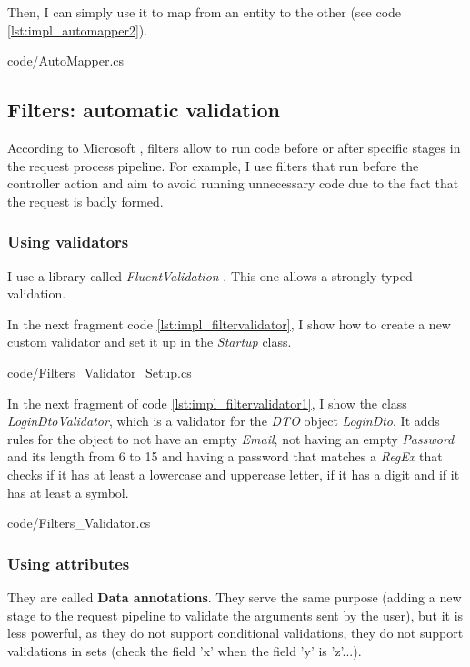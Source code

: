             Then, I can simply use it to map from an entity to the other (see code \ref{lst:impl_automapper2}). 
            
            {code/AutoMapper.cs}

    \subsection{Filters: automatic validation}
        According to Microsoft \cite{Filters}, filters allow to run code before or after specific stages in the request process pipeline. 
        For example, I use filters that run before the controller action and aim to avoid running unnecessary code due to the fact that the 
        request is badly formed.

        \subsubsection{Using validators}
            I use a library called \textit{FluentValidation} \cite{FluentValidation}. This one allows a strongly-typed validation.

            In the next fragment code \ref{lst:impl_filtervalidator}, I show how to create a new custom validator and set it up in the \textit{Startup} class.
            
            {code/Filters_Validator_Setup.cs}

            In the next fragment of code \ref{lst:impl_filtervalidator1}, I show the class \textit{LoginDtoValidator}, which is a validator for the \textit{DTO} object \textit{LoginDto}. It adds rules for the object to not have an empty \textit{Email}, not having an empty \textit{Password} and its length from 6 to 15 and having a password that matches a \textit{RegEx} that checks if it has at least a lowercase and uppercase letter, if it has a digit and if it has at least a symbol.
            
            {code/Filters_Validator.cs}

        \subsubsection{Using attributes}
            They are called \textbf{Data annotations}. They serve the same purpose (adding a new stage to the request pipeline to validate the arguments sent by the user), 
            but it is less powerful, as they do not support conditional validations, they do not support validations in sets 
            (check the field 'x' when the field 'y' is 'z'...).


